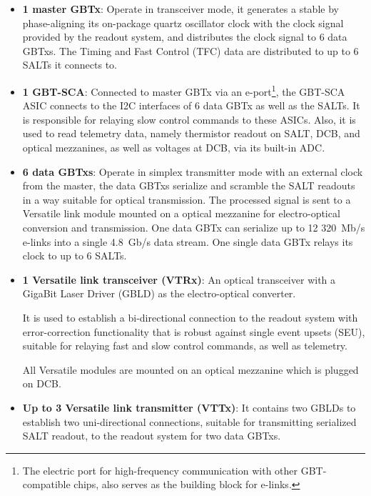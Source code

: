 \begin{itemize}
    \item \textbf{1 master GBTx}:
        Operate in transceiver mode,
        it generates a stable by phase-aligning its on-package quartz oscillator
        clock with the clock signal provided by the readout system,
        and distributes the clock signal to 6 data GBTxs.
        The Timing and Fast Control (TFC) data are distributed to up to 6 SALTs
        it connects to.

    \item \textbf{1 GBT-SCA}:
        Connected to master GBTx via an e-port\footnote{
            The electric port for high-frequency communication with other
            GBT-compatible chips,
            also serves as the building block for e-links.
        },
        the GBT-SCA ASIC connects to the I2C interfaces
        of 6 data GBTx as well as the SALTs.
        It is responsible for relaying slow control commands to these ASICs.
        Also, it is used to read telemetry data,
        namely thermistor readout on SALT, DCB, and optical mezzanines,
        as well as voltages at DCB,
        via its built-in ADC.

    \item \textbf{6 data GBTxs}:
        Operate in simplex transmitter mode with an external clock from the
        master,
        the data GBTxs serialize and scramble the SALT readouts in a way
        suitable for optical transmission.
        The processed signal is sent to a Versatile link module mounted on
        a optical mezzanine for electro-optical conversion and transmission.
        One data GBTx can serialize up to 12 320~Mb/s e-links into a single
        4.8~Gb/s data stream.
        One single data GBTx relays its clock to up to 6 SALTs.

    \item \textbf{1 Versatile link transceiver (VTRx)}:
        An optical transceiver with a GigaBit Laser Driver (GBLD)
        as the electro-optical converter.

        It is used to establish a bi-directional connection to the readout
        system with error-correction functionality that is robust against single
        event upsets (SEU),
        suitable for relaying fast and slow control commands, as well as
        telemetry.

        All Versatile modules are mounted on an optical mezzanine which is
        plugged on DCB.

    \item \textbf{Up to 3 Versatile link transmitter (VTTx)}:
        It contains two GBLDs to establish two uni-directional connections,
        suitable for transmitting serialized SALT readout,
        to the readout system for two data GBTxs.
\end{itemize}

